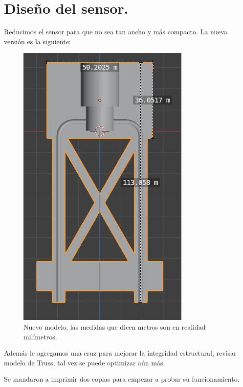 \section{Diseño del sensor.}
Reducimos el sensor para que no sea tan ancho y más compacto. La nueva versión es la siguiente:

\begin{figure}[!ht]
	\centering
	\includegraphics[width=0.257\linewidth]{Figures/07_04_2025/New_model}
	\caption{Nuevo modelo, las medidas que dicen metros son en realidad milímetros.}
	\label{fig:newmodel}
\end{figure}

Además le agregamos una cruz para mejorar la integridad estructural, revisar modelo de Truss, tal vez se puede optimizar aún más.

Se mandaron a imprimir dos copias para empezar a probar su funcionamiento.